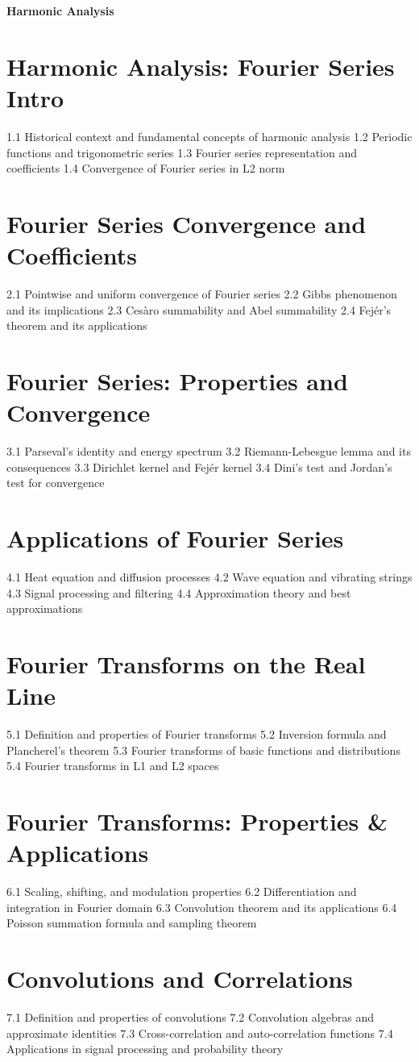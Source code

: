 {\LARGE \bf{Harmonic Analysis}}
\section{Harmonic Analysis: Fourier Series Intro}
1.1 Historical context and fundamental concepts of harmonic analysis
1.2 Periodic functions and trigonometric series
1.3 Fourier series representation and coefficients
1.4 Convergence of Fourier series in L2 norm
\section{Fourier Series Convergence and Coefficients}
2.1 Pointwise and uniform convergence of Fourier series
2.2 Gibbs phenomenon and its implications
2.3 Cesàro summability and Abel summability
2.4 Fejér's theorem and its applications
\section{Fourier Series: Properties and Convergence}
3.1 Parseval's identity and energy spectrum
3.2 Riemann-Lebesgue lemma and its consequences
3.3 Dirichlet kernel and Fejér kernel
3.4 Dini's test and Jordan's test for convergence
\section{Applications of Fourier Series}
4.1 Heat equation and diffusion processes
4.2 Wave equation and vibrating strings
4.3 Signal processing and filtering
4.4 Approximation theory and best approximations
\section{Fourier Transforms on the Real Line}
5.1 Definition and properties of Fourier transforms
5.2 Inversion formula and Plancherel's theorem
5.3 Fourier transforms of basic functions and distributions
5.4 Fourier transforms in L1 and L2 spaces
\section{Fourier Transforms: Properties \& Applications}
6.1 Scaling, shifting, and modulation properties
6.2 Differentiation and integration in Fourier domain
6.3 Convolution theorem and its applications
6.4 Poisson summation formula and sampling theorem
\section{Convolutions and Correlations}
7.1 Definition and properties of convolutions
7.2 Convolution algebras and approximate identities
7.3 Cross-correlation and auto-correlation functions
7.4 Applications in signal processing and probability theory
